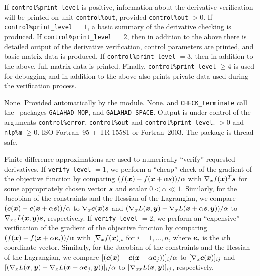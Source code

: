 \documentclass{galahad}
\newcommand{\packagename}{CHECK}
\begin{document}

\galinfo
If {\tt control\%print\_level} is positive, information about the
derivative verification will be printed on unit {\tt control\-\%out},
provided {\tt control\%out} $> 0$.
If {\tt control\%print\_level} $= 1$, a basic summary of the
derivative checking is produced.  If {\tt control\%print\_level} $=
2$, then in addition to the above there is detailed output of the
derivative verification, control parameters are printed, and basic
matrix data is produced.  If {\tt control\%print\_level} $=
3$, then in addition to the above, full matrix data is printed.
Finally, {\tt control\%print\_level} $\geq 4$ is used for debugging
and in addition to the above also prints private data used during the
verification process.    


\galgeneral

\galcommon None.
\galworkspace Provided automatically by the module.
\galroutines None. 
\galmodules {\tt \packagename\_verify} and {\tt \packagename\_terminate} call the \galahad\ packages
{\tt GALAHAD\_MOP}, and
{\tt GALAHAD\_SPACE}.
\galio Output is under control of the arguments
 {\tt control\%error}, {\tt control\%out} and {\tt control\%print\_level}.
 $> 0$ and {\tt nlp\%m} $\geq 0$.
\galportability ISO Fortran~95 + TR 15581 or Fortran~2003. 
The package is thread-safe.


\galmethod
Finite difference approximations are used to numerically ``verify'' requested
derivatives.  If {\tt verify\_level} $=1$, we perform a
``cheap'' check of the gradient of the objective function by
comparing $(f({\bm{x}}) - f({\bm{x}}+\alpha {\bm{s}}))/\alpha$ with $\nabla_x f({\bm{x}})^T{\bm{s}}$
for some appropriately chosen vector ${\bm{s}}$ and scalar $0 < \alpha \ll
1$.  Similarly, for the Jacobian of the constraints and the Hessian of
the Lagrangian, we compare $({\bm{c}}({\bm{x}}) - {\bm{c}}({\bm{x}}+\alpha
{\bm{s}}))/\alpha$ to $\nabla_x {\bm{c}}({\bm{x}}){\bm{s}}$ and $(\nabla_xL({\bm{x}},{\bm{y}})
- \nabla_xL({\bm{x}}+\alpha{\bm{s}},{\bm{y}}))/\alpha$ to $\nabla_{xx}
L({\bm{x}},{\bm{y}}){\bm{s}}$, respectively.  If {\tt verify\_level} $=2$, we perform an
``expensive'' verification of the gradient of the objective function by
comparing $(f({\bm{x}}) - f({\bm{x}}+\alpha{\bm{e}}_i))/\alpha$ with $[\nabla_x
f({\bm{x}})]_i$ for $i = 1, \dots, n$, where ${\bm{e}}_i$ is the $i$th
coordinate vector.  Similarly, for the Jacobian of the constraints and the Hessian of
the Lagrangian, we compare $[({\bm{c}}({\bm{x}}) - {\bm{c}}({\bm{x}}+\alpha
{\bm{e}}_j))]_i/\alpha$ to $[\nabla_x {\bm{c}}({\bm{x}})]_{ij}$ and $[(\nabla_xL({\bm{x}},{\bm{y}})
- \nabla_xL({\bm{x}}+\alpha{\bm{e}}_j,{\bm{y}}))]_i/\alpha$ to $[\nabla_{xx}
L({\bm{x}},{\bm{y}})]_{ij}$, respectively.   
\end{document}

